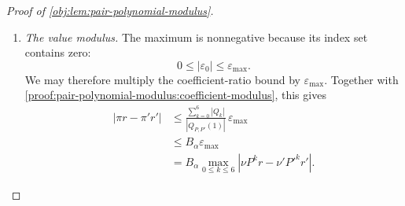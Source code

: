 \begin{proof}[Proof of \cref{obj:lem:pair-polynomial-modulus}]
\begin{enumerate}
For the denominator, the reverse triangle inequality gives
\[
|1-\xi_\ell|
\ge1-|\xi_\ell|
\ge1-\alpha>0
\qquad(1\le\ell\le6).
\]
The empty product equals one. Successively multiplying the nonnegative
distance bounds gives, by induction,
\[
\prod_{\ell=1}^{n_{\mathrm{root}}}|1-\xi_\ell|
\ge(1-\alpha)^{n_{\mathrm{root}}}
\qquad
(n_{\mathrm{root}}\in\{0,\ldots,6\}).
\]
Indeed, for \(n_{\mathrm{root}}<6\), the induction step is
\[
\begin{aligned}
\prod_{\ell=1}^{n_{\mathrm{root}}+1}|1-\xi_\ell|
&=|1-\xi_{n_{\mathrm{root}}+1}|
       \prod_{\ell=1}^{n_{\mathrm{root}}}|1-\xi_\ell|\\
&\ge(1-\alpha)
       \prod_{\ell=1}^{n_{\mathrm{root}}}|1-\xi_\ell|\\
&\ge(1-\alpha)^{n_{\mathrm{root}}+1}.
\end{aligned}
\]
Evaluating the root factorization at one consequently gives
\[
|Q_{P,P'}(1)|
=\prod_{\ell=1}^6|1-\xi_\ell|
\ge(1-\alpha)^6>0.
\]

Combining the numerator and denominator bounds, with positive denominators,
proves
\[
\frac{\sum_{k=0}^6|Q_k|}{|Q_{P,P'}(1)|}
\le\frac{(1+\alpha)^6}{(1-\alpha)^6}
=\left(\frac{1+\alpha}{1-\alpha}\right)^6
=B_\alpha.
\]

\item \emph{The value modulus.}
The maximum is nonnegative because its index set contains zero:
\[
0\le|\varepsilon_0|\le\varepsilon_{\max}.
\]
We may therefore multiply the coefficient-ratio bound by
\(\varepsilon_{\max}\). Together with \cref{proof:pair-polynomial-modulus:coefficient-modulus}, this gives
\[
\begin{aligned}
|\pi r-\pi'r'|
&\le
\frac{\sum_{k=0}^6|Q_k|}{|Q_{P,P'}(1)|}\,
\varepsilon_{\max}\\
&\le B_\alpha\varepsilon_{\max}\\
&=B_\alpha
  \max_{0\le k\le6}|\nu P^kr-\nu'P'^kr'|.
\end{aligned}
\]
\end{enumerate}
\end{proof}
